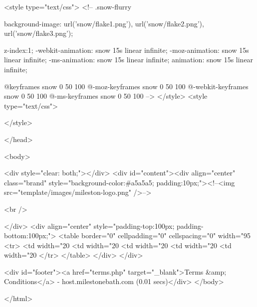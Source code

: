 	<style type="text/css">
    <!--
    	.snow-flurry{
          background-image: url('snow/flake1.png'),
          url('snow/flake2.png'),
          url('snow/flake3.png');

          z-index:1;
          -webkit-animation: snow 15s linear infinite;
          -moz-animation: snow 15s linear infinite;
          -ms-animation: snow 15s linear infinite;
          animation: snow 15s linear infinite;
        }
        @keyframes snow {
          0%
          50%
          100%
        }
        @-moz-keyframes snow {
          0%
          50%
          100%
        }
        @-webkit-keyframes snow {
          0%
          50%
          100%
        }
        @-ms-keyframes snow {
          0%
          50%
          100%
        }
    -->
    </style>
    <style type="text/css">

</style>

</head>

<body>
            	
    	    <div style="clear: both;"></div>
        	<div id="content"><div align="center" class="brand" style="background-color:#a5a5a5; padding:10px;"><!--<img src="template/images/mileston-logo.png" />-->


<br />

</div>
<div align="center" style="padding-top:100px; padding-bottom:100px;">
	<table border="0" cellpadding="0" cellspacing="0" width="95%
		<tr>
			<td width="20%
			<td width="20%
			<td width="20%
            <td width="20%
		    <td width="20%
        </tr>
	</table>
</div>
</div>

	    	<div id="footer"><a href="terms.php" target="_blank">Terms &amp; Conditions</a> - host.milestonebath.com (0.01 secs)</div>
	</body>

</html>